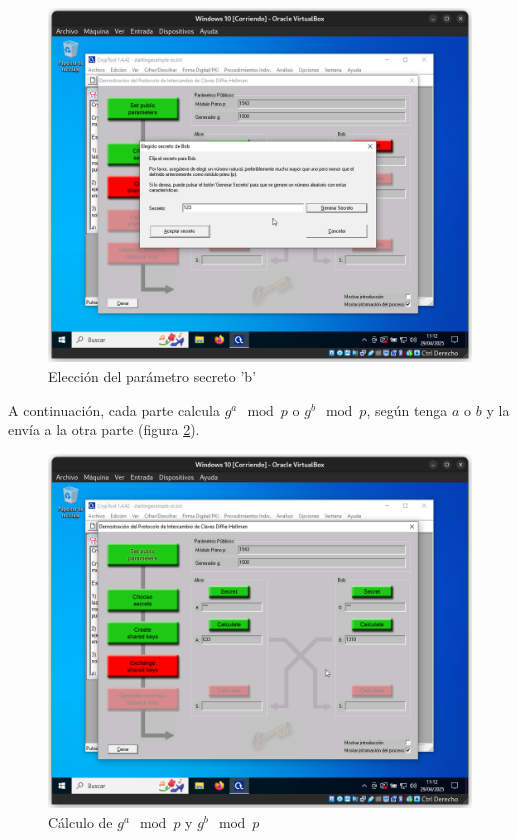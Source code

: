 \begin{figure}[H]
    \includegraphics[width=\textwidth]{D&H-4.png}
    \caption{Elección del parámetro secreto 'b'}
    \label{fig:bparam}
\end{figure}

A continuación, cada parte calcula $g^a\mod{p}$ o $g^b\mod{p}$, según tenga $a$ o $b$ y la envía a la otra parte (figura \ref{fig:modulos}).

\begin{figure}[H]
    \includegraphics[width=\textwidth]{D&H-5.png}
    \caption{Cálculo de $g^a\mod{p}$ y $g^b\mod{p}$}
    \label{fig:modulos}
\end{figure}

